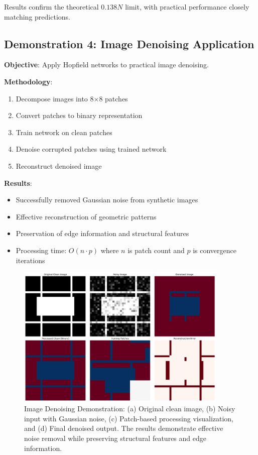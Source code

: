 \documentclass[11pt,a4paper]{article}
\begin{document}
Results confirm the theoretical $0.138N$ limit, with practical performance closely matching predictions.

\subsection{Demonstration 4: Image Denoising Application}

\textbf{Objective}: Apply Hopfield networks to practical image denoising.

\textbf{Methodology}:
\begin{enumerate}
    \item Decompose images into 8×8 patches
    \item Convert patches to binary representation
    \item Train network on clean patches
    \item Denoise corrupted patches using trained network
    \item Reconstruct denoised image
\end{enumerate}

\textbf{Results}:
\begin{itemize}
    \item Successfully removed Gaussian noise from synthetic images
    \item Effective reconstruction of geometric patterns
    \item Preservation of edge information and structural features
    \item Processing time: $O(n \cdot p)$ where $n$ is patch count and $p$ is convergence iterations
\end{itemize}

\begin{figure}[H]
\centering
\includegraphics[width=0.9\textwidth]{image_denoising.png}
\caption{Image Denoising Demonstration: (a) Original clean image, (b) Noisy input with Gaussian noise, (c) Patch-based processing visualization, and (d) Final denoised output. The results demonstrate effective noise removal while preserving structural features and edge information.}
\label{fig:image_denoising}
\end{figure}
\end{document}
